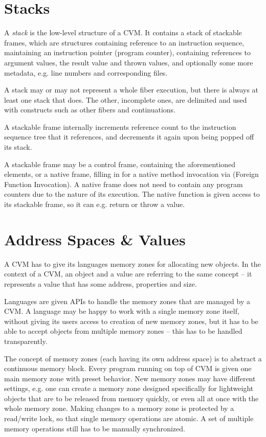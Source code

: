 \section{Stacks}

A {\em stack} is the low-level structure of a CVM. It contains a stack of stackable frames, which are structures containing reference to an instruction sequence, maintaining an instruction pointer (program counter), containing references to argument values, the result value and thrown values, and optionally some more metadata, e.g. line numbers and corresponding files. 

A stack may or may not represent a whole fiber execution, but there is always at least one stack that does. The other, incomplete ones, are delimited and used with constructs such as other fibers and continuations. 

A stackable frame internally increments reference count to the instruction sequence tree that it references, and decrements it again upon being popped off its stack. 

A stackable frame may be a control frame, containing the aforementioned elements, or a native frame, filling in for a native method invocation via  (Foreign Function Invocation). A native frame does not need to contain any program counters due to the nature of its execution. The native function is given access to its stackable frame, so it can e.g. return or throw a value. 






\section{Address Spaces \& Values}

A CVM has to give its languages memory zones for allocating new objects. In the context of a CVM, an object and a value are referring to the same concept -- it represents a value that has some address, properties and size. 

Languages are given APIs to handle the memory zones that are managed by a CVM. A language may be happy to work with a single memory zone itself, without giving its users access to creation of new memory zones, but it has to be able to accept objects from multiple memory zones -- this has to be handled transparently. 

The concept of memory zones (each having its own address space) is to abstract a continuous memory block. Every program running on top of CVM is given one main memory zone with preset behavior. New memory zones may have different settings, e.g. one can create a memory zone designed specifically for lightweight objects that are to be released from memory quickly, or even all at once with the whole memory zone. Making changes to a memory zone is protected by a read/write lock, so that single memory operations are atomic. A set of multiple memory operations still has to be manually synchronized. 

